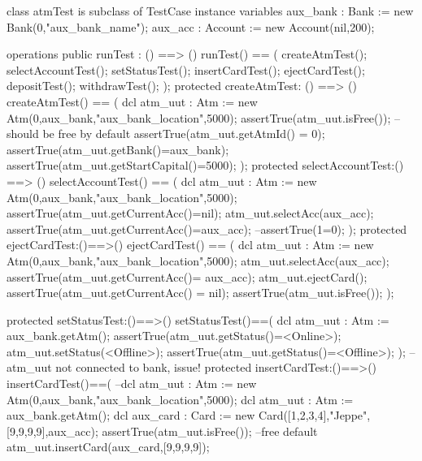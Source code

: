 \documentclass[a4paper]{article}
\begin{document}
\title{}
\author{}
\begin{vdm_al}

class atmTest is subclass of TestCase
instance variables
    aux_bank : Bank := new Bank(0,"aux_bank_name");
    aux_acc : Account := new Account(nil,200); 

operations
    public runTest : () ==> ()
    runTest() == (
        createAtmTest();
        selectAccountTest();
        setStatusTest();
        insertCardTest();
        ejectCardTest();
        depositTest();
        withdrawTest();
    );
    protected createAtmTest: () ==> ()
    createAtmTest() == (
        dcl atm_uut : Atm := new Atm(0,aux_bank,"aux_bank_location",5000); 
        assertTrue(atm_uut.isFree()); --should be free by default
        assertTrue(atm_uut.getAtmId() = 0);
        assertTrue(atm_uut.getBank()=aux_bank);
        assertTrue(atm_uut.getStartCapital()=5000);
    ); 
    protected selectAccountTest:() ==> ()
    selectAccountTest() == (
        dcl atm_uut : Atm := new Atm(0,aux_bank,"aux_bank_location",5000); 
        assertTrue(atm_uut.getCurrentAcc()=nil);
        atm_uut.selectAcc(aux_acc);
        assertTrue(atm_uut.getCurrentAcc()=aux_acc);
        --assertTrue(1=0);
    );
    protected ejectCardTest:()==>()
    ejectCardTest() == (
        dcl atm_uut : Atm := new Atm(0,aux_bank,"aux_bank_location",5000); 
        atm_uut.selectAcc(aux_acc);
        assertTrue(atm_uut.getCurrentAcc()= aux_acc);
        atm_uut.ejectCard();
        assertTrue(atm_uut.getCurrentAcc() = nil);
        assertTrue(atm_uut.isFree());
    );

    protected setStatusTest:()==>()
    setStatusTest()==(
        dcl atm_uut : Atm := aux_bank.getAtm();
        assertTrue(atm_uut.getStatus()=<Online>);
        atm_uut.setStatus(<Offline>);
        assertTrue(atm_uut.getStatus()=<Offline>);
    );
    --atm_uut not connected to bank, issue! 
    protected insertCardTest:()==>()
    insertCardTest()==(
        --dcl atm_uut : Atm := new Atm(0,aux_bank,"aux_bank_location",5000); 
        dcl atm_uut : Atm := aux_bank.getAtm();
        dcl aux_card : Card := new Card([1,2,3,4],"Jeppe",[9,9,9,9],aux_acc);
        assertTrue(atm_uut.isFree()); --free default
        atm_uut.insertCard(aux_card,[9,9,9,9]); 



\end{vdm_al}
\end{document}
